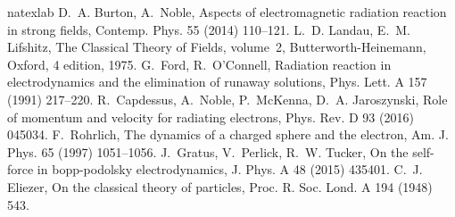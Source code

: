 \documentclass[a4paper,fleqn]{cas-sc}
\begin{document}
\begin{thebibliography}{27}
\expandafter\ifx\csname natexlab\endcsname\relax\def\natexlab#1{#1}\fi
\providecommand{\bibinfo}[2]{#2}
\ifx\xfnm\relax \def\xfnm[#1]{\unskip,\space#1}\fi
\bibinfo{author}{D.~A. Burton}, \bibinfo{author}{A.~Noble},
\newblock \bibinfo{title}{Aspects of electromagnetic radiation reaction in
  strong fields},
\newblock \bibinfo{journal}{Contemp. Phys.} \bibinfo{volume}{55}
  (\bibinfo{year}{2014}) \bibinfo{pages}{110--121}.
\bibinfo{author}{L.~D. Landau}, \bibinfo{author}{E.~M. Lifshitz},
  \bibinfo{title}{The Classical Theory of Fields}, volume~\bibinfo{volume}{2},
  \bibinfo{publisher}{Butterworth-Heinemann}, \bibinfo{address}{Oxford},
  \bibinfo{edition}{4} edition, \bibinfo{year}{1975}.
\bibinfo{author}{G.~Ford}, \bibinfo{author}{R.~O'Connell},
\newblock \bibinfo{title}{Radiation reaction in electrodynamics and the
  elimination of runaway solutions},
\newblock \bibinfo{journal}{Phys. Lett. A} \bibinfo{volume}{157}
  (\bibinfo{year}{1991}) \bibinfo{pages}{217--220}.
\bibinfo{author}{R.~Capdessus}, \bibinfo{author}{A.~Noble},
  \bibinfo{author}{P.~McKenna}, \bibinfo{author}{D.~A. Jaroszynski},
\newblock \bibinfo{title}{Role of momentum and velocity for radiating
  electrons},
\newblock \bibinfo{journal}{Phys. Rev. D} \bibinfo{volume}{93}
  (\bibinfo{year}{2016}) \bibinfo{pages}{045034}.
\bibinfo{author}{F.~Rohrlich},
\newblock \bibinfo{title}{The dynamics of a charged sphere and the electron},
\newblock \bibinfo{journal}{Am. J. Phys.} \bibinfo{volume}{65}
  (\bibinfo{year}{1997}) \bibinfo{pages}{1051--1056}.
\bibinfo{author}{J.~Gratus}, \bibinfo{author}{V.~Perlick},
  \bibinfo{author}{R.~W. Tucker},
\newblock \bibinfo{title}{On the self-force in bopp-podolsky electrodynamics},
\newblock \bibinfo{journal}{J. Phys. A} \bibinfo{volume}{48}
  (\bibinfo{year}{2015}) \bibinfo{pages}{435401}.
\bibinfo{author}{C.~J. Eliezer},
\newblock \bibinfo{title}{On the classical theory of particles},
\newblock \bibinfo{journal}{Proc. R. Soc. Lond. A} \bibinfo{volume}{194}
  (\bibinfo{year}{1948}) \bibinfo{pages}{543}.

\end{thebibliography}
\end{document}
